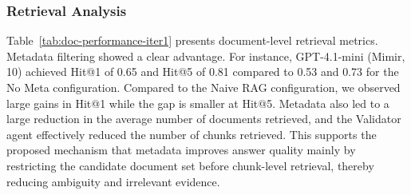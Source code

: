 \documentclass[final,5p,times,twopage,twocolumn,a4paper]{elsarticle}
\begin{document}
\subsubsection{Retrieval Analysis}
Table~\ref{tab:doc-performance-iter1} presents document-level retrieval metrics. Metadata filtering showed a clear advantage. For instance, GPT-4.1-mini (Mimir, 10) achieved Hit@1 of 0.65 and Hit@5 of 0.81 compared to 0.53 and 0.73 for the No Meta configuration.
Compared to the Naive RAG configuration, we observed large gains in Hit@1 while the gap is smaller at Hit@5. Metadata also led to a large reduction in the average number of documents retrieved, and the Validator agent effectively reduced the number of chunks retrieved. This supports the proposed mechanism that metadata improves answer quality mainly by restricting the candidate document set before chunk-level retrieval, thereby reducing ambiguity and irrelevant evidence.
\end{document}
